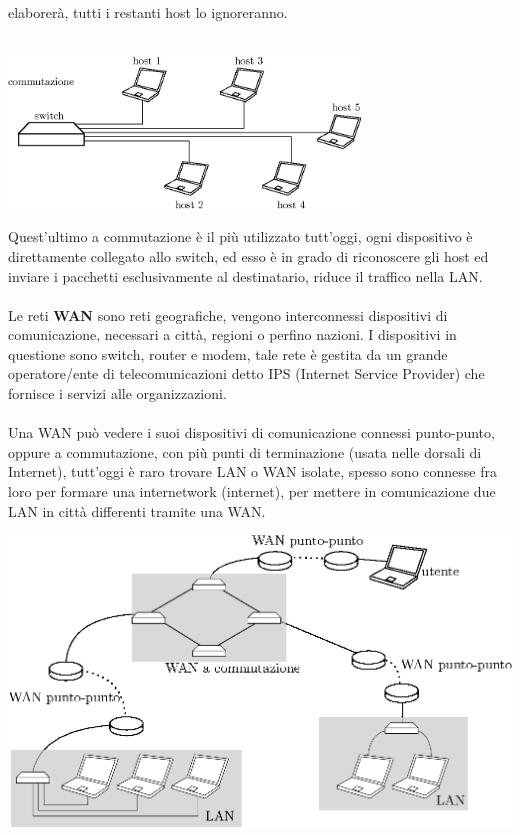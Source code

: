 \documentclass[12pt, letterpaper]{article}
\newcommand{\acc}{\\\hphantom{}\\}
\begin{document}
elaborerà, tutti i restanti host lo ignoreranno.\acc \begin{center}
    \includegraphics[width=0.7\textwidth ]{images/commutazione.eps}
\end{center}
Quest'ultimo a commutazione è il più utilizzato tutt'oggi, ogni dispositivo è direttamente collegato allo switch, ed esso è
in grado di riconoscere gli host ed inviare i pacchetti esclusivamente al destinatario, riduce il traffico nella LAN.\acc
Le reti \textbf{WAN} sono reti geografiche, vengono interconnessi dispositivi di comunicazione, necessari a città, regioni o
perfino nazioni. I dispositivi in questione sono switch, router e modem, tale rete è gestita da un grande operatore/ente di
telecomunicazioni detto IPS (Internet Service Provider) che fornisce i servizi alle organizzazioni.\acc Una WAN può vedere i suoi
dispositivi di comunicazione connessi punto-punto, oppure a commutazione, con più punti di terminazione (usata nelle dorsali di
Internet), tutt'oggi è raro trovare LAN o WAN isolate, spesso sono connesse fra loro per formare una internetwork (internet), per
mettere in comunicazione due LAN in città differenti tramite una WAN.\begin{center}
    \includegraphics[width=1\textwidth ]{images/internetwork.eps}
\end{center}
\end{document}
